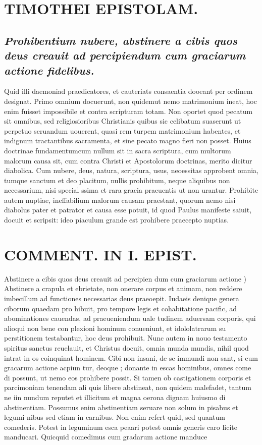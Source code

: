 \documentclass{article}
\begin{document}
\begin{pages}
\section*{TIMOTHEI EPISTOLAM. }
\marginpar{[ p.97 ]}
{}
\subsection*{\textit{Prohibentium nubere, abstinere a cibis quos deus creauit ad percipiendum cum graciarum actione fidelibus. }}\pstart Quid illi daemoniad praedicatores, et cauteriats consaentia dooeant per ordinem designat. Primo omnium docuerunt, non quidemut nemo matrimonium ineat, hoc enim fuisset impossibile et contra scripturam totam. Non oportet quod pecatum sit omnibus, sed religiosioribus Christianis quibus sic celibatum suaserunt ut perpetuo seruandum uouerent, quasi rem turpem matrimonium habentes, et indignum tractantibus sacramenta, et sine pecato magno fieri non posset. Huius doctrinae fundamentumcum nullum sit in sacra scriptura, cum multorum malorum causa sit, cum contra Christi et Apostolorum doctrinas, merito dicitur diabolica. Cum nubere, deus, natura, scriptura, usus, neoessitas approbent omnia, tumque sanctum et deo placitum, nullis prohibitum, neque aliquibus non necessarium, nisi special ssima et rara gracia praeuentis ut non urantur. Prohibite autem nuptiae, ineffabilium malorum causam praestant, quorum nemo nisi diabolus pater et patrator et causa esse potuit, id quod Paulus manifeste saiuit, docuit et scripsit: ideo piaculum grande est prohibere praecepto nuptias.  \pend
\section*{COMMENT. IN I. EPIST. }
\marginpar{[ p.98 ]}\pstart Abstinere a cibis quos deus creauit ad percipien dum cum graciarum actione ) Abstinere a crapula et ebrietate, non onerare corpus et animam, non reddere imbecillum ad functiones necessarias deus praeoepit. Iudaeis denique genera ciborum quaedam pro hibuit, pro tempore legis et cohabitatione pacific, ad abominationes cauendas, ad praeueniendum uale tudinem aduersam corporis, qui alioqui non bene con plexioni hominum conueniunt, et idololatrarum su perstitionem testabantur, hoc deus prohibuit. Nunc autem in nouo testamento spiritus sanctus reuelauit, et Christus docuit, omnia munda mundis, nihil quod intrat in os coinquinat hominem. Cibi non insani, de se immundi non sant, si cum gracarum actione acpiun tur, deoque ; donante in escas hominibus, omnes come di possunt, ut nemo eos prohibere possit. Si tamen ob castigationem corporis et parcimoniam tenendam ali quis libere abstineat, non quidem malefadet, tantum ne iin nundum reputet et illicitum et magna oerona dignam huiusmo di abstinentiam. Possumus enim abstinentiam seruare non solum in pisabus et legumi nibus sed etiam in carnibus. Non enim refert quid, sed quantum comederis. Potest in leguminum esca peaari potest omnis generis caro licite manducari. Quicquid comedimus cum gradarum actione manduce\pend

\end{pages}
\end{document}
